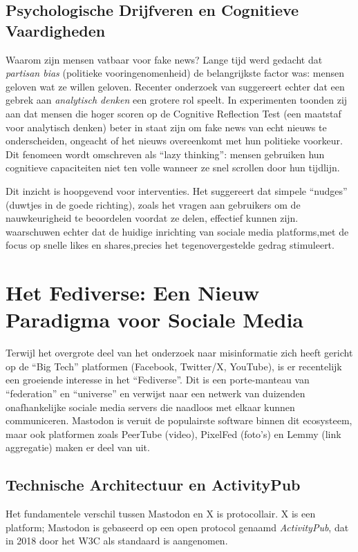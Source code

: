 \subsection{Psychologische Drijfveren en Cognitieve Vaardigheden}
Waarom zijn mensen vatbaar voor fake news? Lange tijd werd gedacht dat \textit{partisan bias} (politieke vooringenomenheid) de belangrijkste factor was: mensen geloven wat ze willen geloven. Recenter onderzoek van \textcite{pennycook2021psychology} suggereert echter dat een gebrek aan \textit{analytisch denken} een grotere rol speelt.
In experimenten toonden zij aan dat mensen die hoger scoren op de Cognitive Reflection Test (een maatstaf voor analytisch denken) beter in staat zijn om fake news van echt nieuws te onderscheiden, ongeacht of het nieuws overeenkomt met hun politieke voorkeur. Dit fenomeen wordt omschreven als ``lazy thinking'': mensen gebruiken hun cognitieve capaciteiten niet ten volle wanneer ze snel scrollen door hun tijdlijn.

Dit inzicht is hoopgevend voor interventies. Het suggereert dat simpele ``nudges'' (duwtjes in de goede richting), zoals het vragen aan gebruikers om de nauwkeurigheid te beoordelen voordat ze delen, effectief kunnen zijn. \textcite{lazer2018science} waarschuwen echter dat de huidige inrichting van sociale media platforms,met de focus op snelle likes en shares,precies het tegenovergestelde gedrag stimuleert.

\section{Het Fediverse: Een Nieuw Paradigma voor Sociale Media}
\label{sec:fediverse}

Terwijl het overgrote deel van het onderzoek naar misinformatie zich heeft gericht op de ``Big Tech'' platformen (Facebook, Twitter/X, YouTube), is er recentelijk een groeiende interesse in het ``Fediverse''. Dit is een porte-manteau van ``federation'' en ``universe'' en verwijst naar een netwerk van duizenden onafhankelijke sociale media servers die naadloos met elkaar kunnen communiceren. Mastodon is veruit de populairste software binnen dit ecosysteem, maar ook platformen zoals PeerTube (video), PixelFed (foto's) en Lemmy (link aggregatie) maken er deel van uit.

\subsection{Technische Architectuur en ActivityPub}
Het fundamentele verschil tussen Mastodon en X is protocollair. X is een platform; Mastodon is gebaseerd op een open protocol genaamd \textit{ActivityPub}, dat in 2018 door het W3C als standaard is aangenomen.

